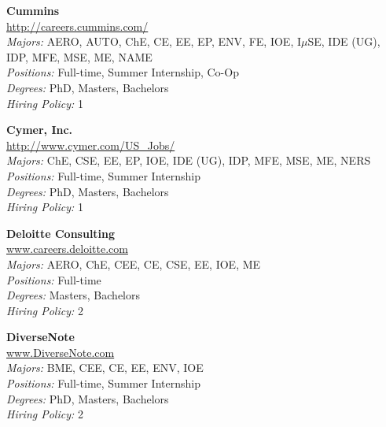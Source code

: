 \documentclass[twoside]{article}
\begin{document}
\begin{center}
\begin{multicols}{3}
\begin{minipage}{.9\columnwidth}{\Large\bf Cummins }\\
	\url{http://careers.cummins.com/}\\
	\emph{Majors:} AERO, AUTO, ChE, CE, EE, EP, ENV, FE, IOE, I$\mu$SE, IDE (UG), IDP, MFE, MSE, ME, NAME\\
	\emph{Positions:} Full-time, Summer Internship, Co-Op\\
	\emph{Degrees:} PhD, Masters, Bachelors\\
	\emph{Hiring Policy:} 1\\
\end{minipage}
 
\begin{minipage}{.9\columnwidth}{\Large\bf Cymer, Inc. }\\
	\url{http://www.cymer.com/US_Jobs/}\\
	\emph{Majors:} ChE, CSE, EE, EP, IOE, IDE (UG), IDP, MFE, MSE, ME, NERS\\
	\emph{Positions:} Full-time, Summer Internship\\
	\emph{Degrees:} PhD, Masters, Bachelors\\
	\emph{Hiring Policy:} 1\\
\end{minipage}
 
\begin{minipage}{.9\columnwidth}{\Large\bf Deloitte Consulting }\\
	\url{www.careers.deloitte.com}\\
	\emph{Majors:} AERO, ChE, CEE, CE, CSE, EE, IOE, ME\\
	\emph{Positions:} Full-time\\
	\emph{Degrees:} Masters, Bachelors\\
	\emph{Hiring Policy:} 2\\
\end{minipage}
 
\begin{minipage}{.9\columnwidth}{\Large\bf DiverseNote }\\
	\url{www.DiverseNote.com}\\
	\emph{Majors:} BME, CEE, CE, EE, ENV, IOE\\
	\emph{Positions:} Full-time, Summer Internship\\
	\emph{Degrees:} PhD, Masters, Bachelors\\
	\emph{Hiring Policy:} 2\\
\end{minipage}
 

\end{multicols}
\end{center}
\end{document}
